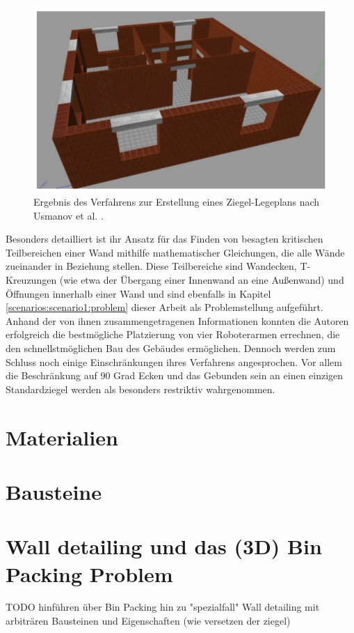 \begin{figure}[ht]
    \centering
    \includegraphics[width=0.6\columnwidth]{fig/sustainability-13-03905-g004.png}
    \caption{Ergebnis des Verfahrens zur Erstellung eines Ziegel-Legeplans nach Usmanov et al. \cite{Usmanov2021}.}
    \label{fig:usmanov}
\end{figure}

Besonders detailliert ist ihr Ansatz für das Finden von besagten kritischen Teilbereichen einer Wand mithilfe mathematischer Gleichungen, die alle Wände zueinander in Beziehung stellen.
Diese Teilbereiche sind Wandecken, T-Kreuzungen (wie etwa der Übergang einer Innenwand an eine Außenwand) und Öffnungen innerhalb einer Wand und sind ebenfalls in Kapitel \ref{scenarios:scenario1:problem} dieser Arbeit als Problemstellung aufgeführt.
Anhand der von ihnen zusammengetragenen Informationen konnten die Autoren erfolgreich die bestmögliche Platzierung von vier Roboterarmen errechnen, die den schnellstmöglichen Bau des Gebäudes ermöglichen.
Dennoch werden zum Schluss noch einige Einschränkungen ihres Verfahrens angesprochen.
Vor allem die Beschränkung auf 90 Grad Ecken und das Gebunden sein an einen einzigen Standardziegel werden als besonders restriktiv wahrgenommen.

\section{Materialien}
\section{Bausteine}
\section{Wall detailing und das (3D) Bin Packing Problem}
\label{basics:wall-detailing}
TODO hinführen über Bin Packing hin zu "spezialfall" Wall detailing mit arbiträren Bausteinen und Eigenschaften (wie versetzen der ziegel)

